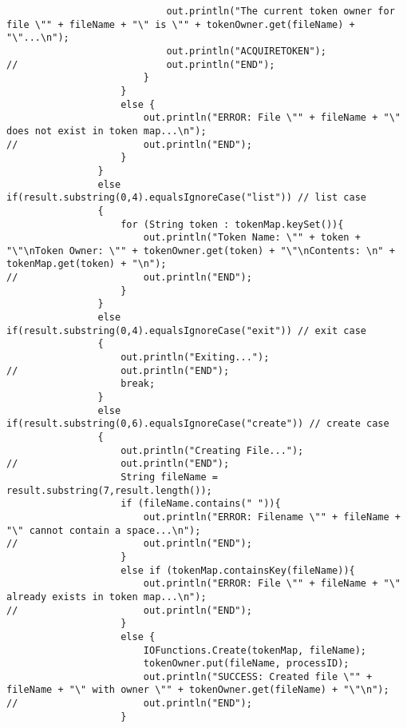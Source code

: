 \documentclass{article}
\begin{document}
\begin{lstlisting}
							out.println("The current token owner for file \"" + fileName + "\" is \"" + tokenOwner.get(fileName) + "\"...\n");
							out.println("ACQUIRETOKEN");
//							out.println("END");
						}
					}
					else {
						out.println("ERROR: File \"" + fileName + "\" does not exist in token map...\n");
//						out.println("END");
					}
				}
				else if(result.substring(0,4).equalsIgnoreCase("list")) // list case
				{
					for (String token : tokenMap.keySet()){
						out.println("Token Name: \"" + token + "\"\nToken Owner: \"" + tokenOwner.get(token) + "\"\nContents: \n" + tokenMap.get(token) + "\n");
//						out.println("END");
					}
				}
				else if(result.substring(0,4).equalsIgnoreCase("exit")) // exit case
				{
					out.println("Exiting...");
//					out.println("END");
					break;
				}
				else if(result.substring(0,6).equalsIgnoreCase("create")) // create case
				{
					out.println("Creating File..."); 
//					out.println("END");
					String fileName = result.substring(7,result.length()); 
					if (fileName.contains(" ")){
						out.println("ERROR: Filename \"" + fileName + "\" cannot contain a space...\n");
//						out.println("END");
					}
					else if (tokenMap.containsKey(fileName)){
						out.println("ERROR: File \"" + fileName + "\" already exists in token map...\n");
//						out.println("END");
					}
					else {
						IOFunctions.Create(tokenMap, fileName);
						tokenOwner.put(fileName, processID);
						out.println("SUCCESS: Created file \"" + fileName + "\" with owner \"" + tokenOwner.get(fileName) + "\"\n");
//						out.println("END");
					}
					

\end{lstlisting}
\end{document}
